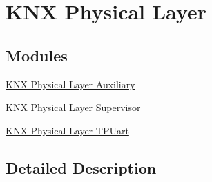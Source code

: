 \hypertarget{group___k_n_x___p_h}{}\section{K\+NX Physical Layer}
\label{group___k_n_x___p_h}
\subsection*{Modules}
\begin{DoxyCompactItemize}
\item 
\hyperlink{group___k_n_x___aux}{K\+N\+X Physical Layer Auxiliary}
\item 
\hyperlink{group___k_n_x___p_h___sup}{K\+N\+X Physical Layer Supervisor}
\item 
\hyperlink{group___k_n_x___p_h___t_p_uart}{K\+N\+X Physical Layer T\+P\+Uart}
\end{DoxyCompactItemize}


\subsection{Detailed Description}
